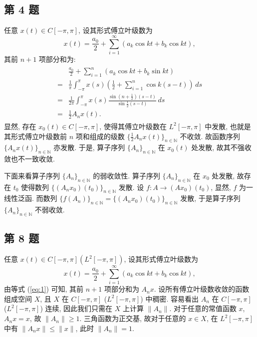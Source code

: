 \documentclass[../main.tex]{subfiles}
\begin{document}
\subsection{第 4 题}
任意 $x(t) \in C[-\pi, \pi]$, 设其形式傅立叶级数为
\[
    x(t) = \frac{a_0}{2} + \sum_{i = 1}^{\infty}(a_k \cos{kt} + b_k \cos{kt}),
\]
其前 $n + 1$ 项部分和为:
\begin{align}
    \begin{split} \label{eq:1}
         & \frac{a_0}{2} + \sum_{i = 1}^{n}(a_k \cos kt + b_k \sin kt) \\
        =& \frac{1}{\pi} \int_{-\pi}^{\pi} x(s)(\frac{1}{2} + \sum_{i = 1}^{n} \cos k(s - t)) \, ds \\
        =& \frac{1}{2 \pi} \int_{-\pi}^{\pi} x(s) \frac{\sin (n + \frac{1}{2})(s - t)}{\sin \frac{1}{2}(s - t)} \, ds \\
        =& \frac{1}{2} A_n x(t).
    \end{split}
\end{align}
显然, 存在 $x_0(t) \in C[-\pi, \pi]$,
使得其傅立叶级数在 $L^2 [-\pi, \pi]$ 中发散,
也就是其形式傅立叶级数前 $n$ 项和组成的级数 $\{ \frac{1}{2} A_n x(t) \}_{n \in \mathbb{N}}$ 不收敛.
故函数序列 $\{ A_n x(t) \}_{n \in \mathbb{N}}$ 亦发散.
于是, 算子序列 $\{ A_n \}_{n \in \mathbb{N}}$ 在 $x_0(t)$ 处发散,
故其不强收敛也不一致收敛.

下面来看算子序列 $\{ A_n \}_{n \in \mathbb{N}}$ 的弱收敛性.
算子序列 $\{ A_n \}_{n \in \mathbb{N}}$ 在 $x_0$ 处发散,
故存在 $t_0$ 使得数列 $\{ (A_n x_0)(t_0) \}_{n \in \mathbb{N}}$ 发散.
设 $f: A \to (A x_0)(t_0)$, 显然, $f$ 为一线性泛函.
而数列 $\{ f(A_n) \}_{n \in \mathbb{N}} = \{ (A_n x_0)(t_0) \}_{n \in \mathbb{N}}$ 发散,
于是算子序列 $\{ A_n \}_{n \in \mathbb{N}}$ 不弱收敛.

\subsection{第 8 题}
任意 $x(t) \in C[-\pi, \pi] (L^2[-\pi, \pi])$, 设其形式傅立叶级数为
\[
    x(t) = \frac{a_0}{2} + \sum_{i = 1}^{\infty}(a_k \cos{kt} + b_k \cos{kt}),
\]
由等式 (\ref{eq:1}) 可知, 其前 $n + 1$ 项部分和为 $A_n x$.
设所有傅立叶级数收敛的函数组成空间 $X$, 且 $X$ 在 $C[-\pi, \pi]$ ($L^2[-\pi, \pi]$) 中稠密.
容易看出 $A_n$ 在 $C[-\pi, \pi]$ ($L^2[-\pi, \pi]$) 连续, 因此我们只需在 $X$ 上计算 $\| A_n \|$.
对于任意的常值函数 $x$, $A_n x = x$, 故 $\| A_n \| \geqslant 1$.
三角函数为正交基, 故对于任意的 $x \in X$,
在 $L^2[-\pi, \pi]$ 中有 $\| A_n x \| \leqslant \| x \|$, 此时 $\| A_n \| = 1$.
\end{document}
